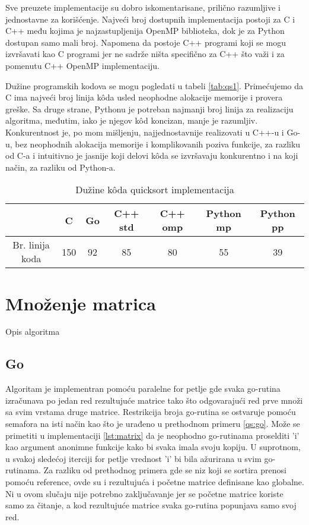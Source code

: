 \documentclass[12pt,oneside]{memoir}
\begin{document}
Sve preuzete implementacije su dobro iskomentarisane, prilično razumljive i jednostavne za korišćenje. Najveći broj dostupnih implementacija postoji za C i C++ među kojima je najzastupljenija OpenMP biblioteka, dok je za Python dostupan samo mali broj. Napomena da postoje C++ programi koji se mogu izvršavati kao C programi jer ne sadrže ništa specifično za C++ što važi i za pomenutu C++ OpenMP implementaciju.

Dužine programskih kodova se mogu pogledati u tabeli \ref{tab:qs1}. Primećujemo da C ima najveći broj linija k\^{o}da usled neophodne alokacije memorije i provera greške. Sa druge strane, Pythonu je potreban najmanji broj linija za realizaciju algoritma, međutim, iako je njegov k\^{o}d koncizan, manje je razumljiv. Konkurentnost je, po mom mišljenju, najjednostavnije realizovati u C++-u i Go-u, bez neophodnih alokacija memorije i komplikovanih poziva funkcije, za razliku od C-a i intuitivno je jasnije koji delovi k\^{o}da se izvršavaju konkurentno i na koji način, za razliku od Python-a.

\begin{table}
\begin{center}
\caption{Dužine k\^{o}da quicksort implementacija}
\begin{tabular}{|c|c|c|c|c|c|c|}
\hline
		&  C 	& Go	& C++ std	& C++ omp	& Python mp & Python pp \\ \hline
Br. linija koda& 150	& 92	&85		&80		&55		&39	 \\ \hline
\end{tabular}
\label{tab:qs2}
\end{center}
\end{table}


\section{Množenje matrica}
Opis algoritma

\subsection{Go}
Algoritam je implementran pomoću paralelne for petlje gde svaka go-rutina izračunava po jedan red rezultujuće matrice tako što odgovarajući red prve množi sa svim vrstama druge matrice. Restrikcija broja go-rutina se ostvaruje pomoću semafora na isti način kao što je urađeno u prethodnom primeru \ref{qs:go}. Može se primetiti u implementaciji \ref{lst:matrix} da je neophodno go-rutinama  proselditi 'i' kao argument anonimne funkcije kako bi svaka imala svoju kopiju. U suprotnom, u svakoj sledećoj iterciji for petlje vrednost 'i' bi bila ažurirana u svim go-rutinama. Za razliku od prethodnog primera gde se niz koji se sortira prenosi pomoću reference, ovde su i rezultujuća i početne matrice definisane kao globalne. Ni u ovom slučaju nije potrebno zaključavanje jer se početne matrice koriste samo za čitanje, a kod rezultujuće matrice svaka go-rutina popunjava samo svoj red. 
\end{document}
